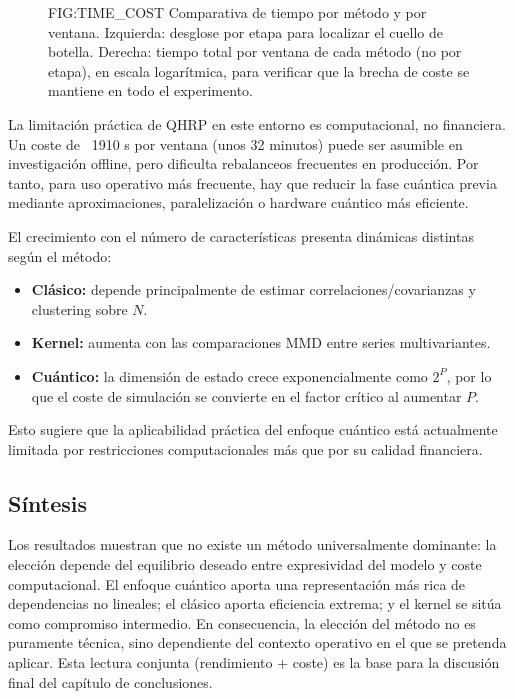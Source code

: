 \begin{figure}[Coste computacional]{FIG:TIME_COST}
{Comparativa de tiempo por método y por ventana. Izquierda: desglose por etapa para localizar el cuello de botella. Derecha: tiempo total por ventana de cada método (no por etapa), en escala logarítmica, para verificar que la brecha de coste se mantiene en todo el experimento.}
\end{figure}

La limitación práctica de QHRP en este entorno es computacional, no financiera. Un coste de ~1910 s por ventana (unos 32 minutos) puede ser asumible en investigación offline, pero dificulta rebalanceos frecuentes en producción. Por tanto, para uso operativo más frecuente, hay que reducir la fase cuántica previa mediante aproximaciones, paralelización o hardware cuántico más eficiente.

El crecimiento con el número de características presenta dinámicas distintas según el método:

\begin{itemize}
	\item \textbf{Clásico:} depende principalmente de estimar correlaciones/covarianzas y clustering sobre \(N\).
	\item \textbf{Kernel:} aumenta con las comparaciones MMD entre series multivariantes.
	\item \textbf{Cuántico:} la dimensión de estado crece exponencialmente como \(2^P\), por lo que el coste de simulación se convierte en el factor crítico al aumentar \(P\).
\end{itemize}

Esto sugiere que la aplicabilidad práctica del enfoque cuántico está actualmente limitada por restricciones computacionales más que por su calidad financiera.

\subsection{Síntesis}
Los resultados muestran que no existe un método universalmente dominante: 
la elección depende del equilibrio deseado entre expresividad del modelo y coste computacional. 
El enfoque cuántico aporta una representación más rica de dependencias no lineales; 
el clásico aporta eficiencia extrema; y el kernel se sitúa como compromiso intermedio. 
En consecuencia, la elección del método no es puramente técnica, sino dependiente del contexto operativo en el que se pretenda aplicar.
Esta lectura conjunta (rendimiento + coste) es la base para la discusión final del capítulo de conclusiones.


